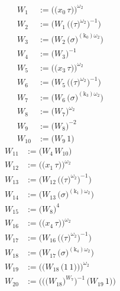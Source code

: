 \begin{align*}
W_{1} &:= \bigl(\bigl(x_{0}\,\tau\bigr)\bigr)^{\omega_2} \\
W_{2} &:= \bigl(W_{1}\,\bigl(\bigl(\tau\bigr)^{\omega_2}\bigr)^{-1}\bigr) \\
W_{3} &:= \bigl(W_{2}\,\bigl(\sigma\bigr)^{(\mathrm{k}_{0})\omega_2}\bigr) \\
W_{4} &:= \bigl(W_{3}\bigr)^{-1} \\
W_{5} &:= \bigl(\bigl(x_{3}\,\tau\bigr)\bigr)^{\omega_2} \\
W_{6} &:= \bigl(W_{5}\,\bigl(\bigl(\tau\bigr)^{\omega_2}\bigr)^{-1}\bigr) \\
W_{7} &:= \bigl(W_{6}\,\bigl(\sigma\bigr)^{(\mathrm{k}_{3})\omega_2}\bigr) \\
W_{8} &:= \bigl(W_{7}\bigr)^{\omega_2} \\
W_{9} &:= \bigl(W_{8}\bigr)^{-2} \\
W_{10} &:= \bigl(W_{9}\,1\bigr)
\end{align*}
\begin{align*}
W_{11} &:= \bigl(W_{4}\,W_{10}\bigr) \\
W_{12} &:= \bigl(\bigl(x_{1}\,\tau\bigr)\bigr)^{\omega_2} \\
W_{13} &:= \bigl(W_{12}\,\bigl(\bigl(\tau\bigr)^{\omega_2}\bigr)^{-1}\bigr) \\
W_{14} &:= \bigl(W_{13}\,\bigl(\sigma\bigr)^{(\mathrm{k}_{1})\omega_2}\bigr) \\
W_{15} &:= \bigl(W_{8}\bigr)^{4} \\
W_{16} &:= \bigl(\bigl(x_{4}\,\tau\bigr)\bigr)^{\omega_2} \\
W_{17} &:= \bigl(W_{16}\,\bigl(\bigl(\tau\bigr)^{\omega_2}\bigr)^{-1}\bigr) \\
W_{18} &:= \bigl(W_{17}\,\bigl(\sigma\bigr)^{(\mathrm{k}_{4})\omega_2}\bigr) \\
W_{19} &:= \bigl(\bigl(W_{18}\,\bigl(1\,1\bigr)\bigr)\bigr)^{\omega_2} \\
W_{20} &:= \bigl(\bigl(\bigl(W_{18}\bigr)^{W_{7}}\bigr)^{-1}\,\bigl(W_{19}\,1\bigr)\bigr)
\end{align*}

